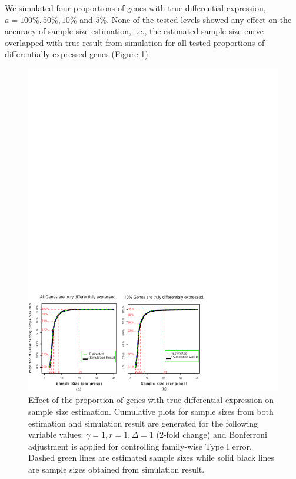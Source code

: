 \documentclass[12pt]{article}
\begin{document}
We simulated four proportions of genes with true differential
expression, $a = 100\%, 50\%, 10\%$ and $5\%$. None of the tested
levels showed any effect on the accuracy of sample size
estimation, i.e., the estimated sample size curve overlapped with
true result from simulation for all tested proportions of
differentially expressed genes (Figure \ref{fig:ResAlt}).

\begin{figure}%
  \caption[Effect of the proportion of genes with true differential
    expression on sample size estimation] {Effect of the proportion of
    genes with true differential expression on sample size estimation.
    Cumulative plots for sample sizes from both estimation and
    simulation result are generated for the following variable values:
    $\gamma = 1, r = 1, \Delta = 1$ (2-fold change) and Bonferroni
    adjustment is applied for controlling family-wise Type I error. Dashed green
    lines are estimated sample sizes while solid black lines are
    sample sizes obtained from simulation result.}
  \label{fig:ResAlt}
  \centerline{\includegraphics*[width=\textwidth]{ResAlt.pdf}}
\end{figure}
\end{document}
